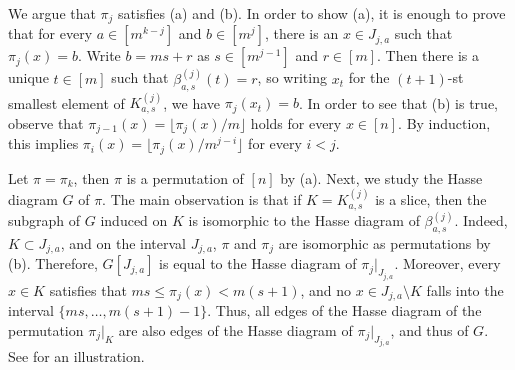 \documentclass[11pt]{article}
\theoremstyle{definition}
\begin{document}
We argue that $\pi_{j}$ satisfies (a) and (b). In order to show (a), it is enough to prove that  for every $a\in [m^{k-j}]$ and $b\in [m^j]$, there is an $x\in J_{j,a}$ such that $\pi_j(x)=b$. Write $b=ms+r$ as $s\in [m^{j-1}]$ and $r\in [m]$. Then there is a unique $t\in [m]$ such that $\beta_{a,s}^{(j)}(t)=r$, so writing $x_t$ for the $(t+1)$-st smallest element of $K^{(j)}_{a,s}$, we have $\pi_j(x_t)=b$. In order to see that (b) is true, observe that $\pi_{j-1}(x)=\lfloor \pi_{j}(x)/m\rfloor$ holds for every $x\in [n]$. By induction, this implies $\pi_i(x)=\lfloor \pi_j(x)/m^{j-i}\rfloor$ for every $i<j$.

Let $\pi=\pi_k$, then $\pi$ is a permutation of $[n]$ by (a). Next, we study the Hasse diagram $G$ of $\pi$. The main observation is that if $K=K^{(j)}_{a,s}$ is a slice, then the subgraph of $G$ induced on $K$ is isomorphic to the Hasse diagram of $\beta^{(j)}_{a,s}$. Indeed, $K\subset J_{j,a}$, and on the interval $J_{j,a}$, $\pi$ and $\pi_{j}$ are isomorphic as permutations by (b). Therefore, $G[J_{j,a}]$ is equal to the Hasse diagram of $\pi_j|_{J_{j,a}}$. Moreover, every $x\in K$ satisfies that $ms\leq \pi_j(x)<m(s+1)$, and no $x\in J_{j,a}\setminus K$ falls into the interval $\{ms,\dots,m(s+1)-1\}$. Thus, all edges of the Hasse diagram of the permutation $\pi_j|_{K}$  are also edges of the Hasse diagram of $\pi_j|_{J_{j,a}}$, and thus of $G$. See  for an illustration.
\end{document}
